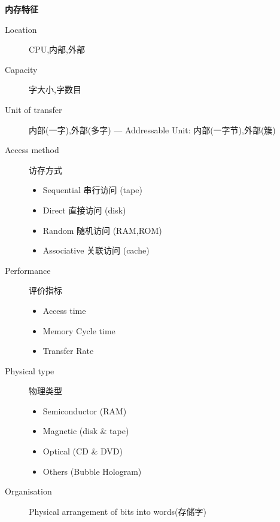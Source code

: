 \textbf{内存特征}
\begin{description}
	\item[Location]CPU,内部,外部
	\item[Capacity]字大小,字数目
	\item[Unit of transfer]内部(一字),外部(多字) --- Addressable Unit: 内部(一字节),外部(簇)
	\item[Access method] 访存方式
		\begin{itemize}
			\item Sequential 串行访问 (tape)
			\item Direct 直接访问 (disk)
			\item Random 随机访问 (RAM,ROM)
			\item Associative 关联访问 (cache)
		\end{itemize}
	\item[Performance] 评价指标
		\begin{itemize}
			\item Access time
			\item Memory Cycle time
			\item Transfer Rate
		\end{itemize}
	\item[Physical type] 物理类型
		\begin{itemize}
			\item Semiconductor (RAM)
			\item Magnetic (disk \& tape)
			\item Optical (CD \& DVD)
			\item Others (Bubble Hologram)
		\end{itemize}
	\item[Organisation] Physical arrangement of bits into words(存储字)
\end{description}


